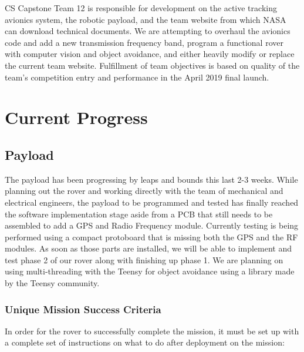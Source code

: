 \documentclass[journal,10pt,draftclsnofoot,onecolumn,compsoc]{IEEEtran} \usepackage[margin=0.75in]{geometry}
\begin{document}
\noindent CS Capstone Team 12 is responsible for development on the active tracking avionics system, the robotic payload, and the team website from which NASA can download technical documents. We are attempting to overhaul the avionics code and add a new transmission frequency band, program a functional rover with computer vision and object avoidance, and either heavily modify or replace the current team website. Fulfillment of team objectives is based on quality of the team's competition entry and performance in the April 2019 final launch.

\section{Current Progress}

\subsection{Payload}

The payload has been progressing by leaps and bounds this last 2-3 weeks. While planning out the rover and working directly with the team of mechanical and electrical engineers, the payload to be programmed and tested has finally reached the software implementation stage aside from a PCB that still needs to be assembled to add a GPS and Radio Frequency module. Currently testing is being performed using a compact protoboard that is missing both the GPS and the RF modules. As soon as those parts are installed, we will be able to implement and test phase 2 of our rover along with finishing up phase 1. We are planning on using multi-threading with the Teensy for object avoidance using a library made by the Teensy community. 

\subsubsection {Unique Mission Success Criteria}

In order for the rover to successfully complete the mission, it must be set up with a complete set of instructions on what to do after deployment on the mission:
\end{document}
